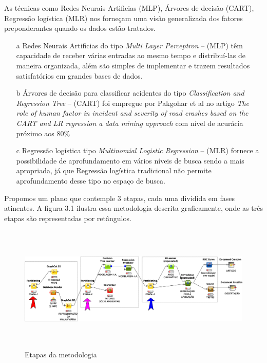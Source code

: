 As técnicas como Redes Neurais Artificias (MLP), Árvores de decisão (CART), Regressão logística (MLR) nos forneçam uma
visão generalizada dos fatores preponderantes quando os dados estão tratados.

\begin{itemize}
 \item[a] Redes Neurais Artificias do tipo \textit{ Multi Layer Perceptron}  -- (MLP) têm capacidade de receber várias entradas ao mesmo tempo e distribuí-las de maneira organizada, além 
	  são simples de implementar e trazem resultados satisfatórios em grandes bases de dados.
 
 \item[b] Árvores de decisão para classificar acidentes do tipo \textit{ Classification and Regression Tree}  -- (CART) foi empregue por Pakgohar et al no artigo 
	  \textit{The role of human factor in incident and severity of road crashes based on the CART and LR regression a data mining approach}  com nível de acurácia próximo aos 80\%

 \item[c] Regressão logística tipo \textit{Multinomial Logistic Regression} -- (MLR) fornece a possibilidade de aprofundamento em vários níveis de busca sendo a mais apropriada, já que Regressão logística 
	  tradicional não permite aprofundamento desse tipo no espaço de busca.
\end{itemize}



Propomos um plano que contemple 3 etapas, cada uma dividida em fases atinentes. A figura 3.1 ilustra essa metodologia descrita graficamente, onde as três etapas são representadas por retângulos.
 
\begin{figure}[ht]
\centering
\caption{Etapas da metodologia}
\includegraphics[width=150mm, height=60mm]{Figuras/BigData/Etapas.png}
\end{figure}

